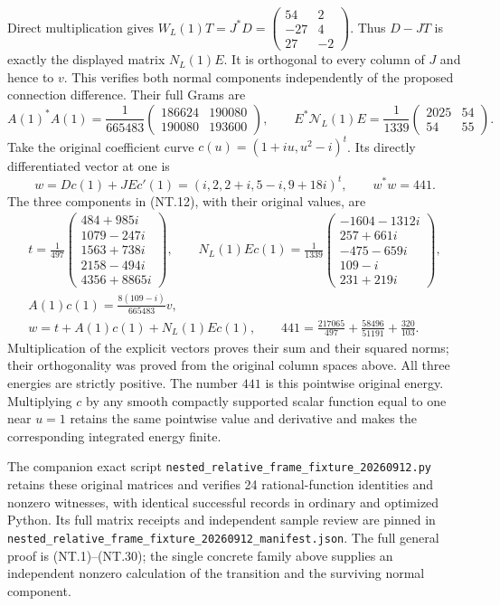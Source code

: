 \documentclass[11pt]{article}
\begin{document}
Direct multiplication gives
$W_L(1)T=J^*D=\left(\begin{smallmatrix}54&2\\-27&4\\27&-2\end{smallmatrix}\right)$.
Thus $D-JT$ is exactly the displayed matrix $N_L(1)E$.
It is orthogonal to every column of $J$ and hence to $v$.
This verifies both normal components independently of the proposed
connection difference. Their full Grams are
\[
 A(1)^*A(1)=\frac1{665483}
 \begin{pmatrix}186624&190080\\190080&193600\end{pmatrix},\qquad
 E^*\mathcal N_L(1)E=\frac1{1339}
 \begin{pmatrix}2025&54\\54&55\end{pmatrix}.
 \tag{NT.35}
\]
Take the original coefficient curve $c(u)=(1+iu,u^2-i)^t$.
Its directly differentiated vector at one is
\[
 w=Dc(1)+JEc'(1)=(i,2,2+i,5-i,9+18i)^t,\qquad w^*w=441.
 \tag{NT.36}
\]
The three components in (NT.12), with their original values, are
\[
 \begin{gathered}
 t=\frac1{497}\begin{pmatrix}484+985i\\1079-247i\\1563+738i\\2158-494i\\4356+8865i\end{pmatrix},\qquad
 N_L(1)Ec(1)=\frac1{1339}\begin{pmatrix}-1604-1312i\\257+661i\\-475-659i\\109-i\\231+219i\end{pmatrix},\\
 A(1)c(1)=\frac{8(109-i)}{665483}v,\\
 w=t+A(1)c(1)+N_L(1)Ec(1),\qquad
 \boxed{441=\frac{217065}{497}+\frac{58496}{51191}+\frac{320}{103}.}
 \end{gathered}
 \tag{NT.37}
\]
Multiplication of the explicit vectors proves their sum and their
squared norms; their orthogonality was proved from the original
column spaces above. All three energies are strictly positive.
The number $441$ is this pointwise original energy. Multiplying
$c$ by any smooth compactly supported scalar function equal to one
near $u=1$ retains the same pointwise value and derivative and
makes the corresponding integrated energy finite.

The companion exact script
\nolinkurl{nested_relative_frame_fixture_20260912.py} retains
these original matrices and verifies 24 rational-function identities
and nonzero witnesses, with identical successful records in ordinary
and optimized Python. Its full matrix receipts and independent
sample review are pinned in
\nolinkurl{nested_relative_frame_fixture_20260912_manifest.json}.
The full general proof is (NT.1)--(NT.30); the single concrete
family above supplies an independent nonzero calculation of the
transition and the surviving normal component.
\end{document}
